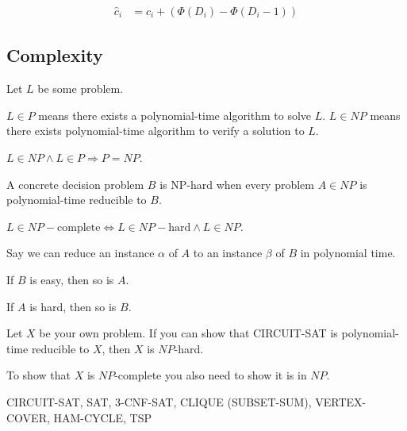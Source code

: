 \documentclass[landscape]{cheat}
\begin{document}
\begin{multicols*}{3}
\begin{align*}
    \hat{c}_i &= c_i + (\Phi(D_i) - \Phi(D_i - 1))
\end{align*}

\subsection{Complexity}

Let $L$ be some problem.

$L \in P$ means there exists a polynomial-time algorithm to solve $L$.
$L \in NP$ means there exists polynomial-time algorithm to verify a solution to $L$. 

$L \in NP \wedge L \in P \Rightarrow P = NP$.

A concrete decision problem $B$ is NP-hard when every problem
$A \in NP$ is polynomial-time reducible to $B$.

$L \in NP-\text{complete} \Leftrightarrow L \in NP-\text{hard} \wedge L \in NP$.


Say we can reduce an instance $\alpha$ of $A$ to an instance $\beta$ of $B$ in polynomial time. 

If $B$ is easy, then so is $A$.

If $A$ is hard, then so is $B$.

Let $X$ be your own problem.
If you can show that CIRCUIT-SAT is polynomial-time reducible to $X$, then $X$ is $NP$-hard.

To show that $X$ is $NP$-complete you also need to show it is in $NP$.

CIRCUIT-SAT, SAT, 3-CNF-SAT, CLIQUE (SUBSET-SUM), VERTEX-COVER, HAM-CYCLE, TSP


\end{multicols*}
\end{document}
